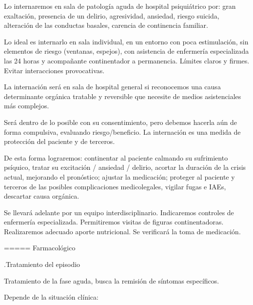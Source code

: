 \documentclass[encares.tex]{subfiles}
\begin{document}
Lo internaremos en sala de patología aguda de hospital psiquiátrico por: gran exaltación, presencia de un delirio, agresividad, ansiedad, riesgo suicida, alteración de las conductas basales, carencia de continencia familiar.

Lo ideal es internarlo en sala individual, en un entorno con poca estimulación, sin elementos de riesgo (ventanas, espejos), con asistencia de enfermería especializada las 24 horas y acompañante continentador a permanencia. Límites claros y firmes. Evitar interacciones provocativas.

La internación será en sala de hospital general si reconocemos una causa determinante orgánica tratable y reversible que necesite de medios asistenciales más complejos.

Será dentro de lo posible con su consentimiento, pero debemos hacerla aún de forma compulsiva, evaluando riesgo/beneficio. La internación es una medida de protección del paciente y de terceros.

De esta forma lograremos: continentar al paciente calmando su sufrimiento psíquico, tratar su excitación / ansiedad / delirio, acortar la duración de la crisis actual, mejorando el pronóstico; ajustar la medicación; proteger al paciente y terceros de las posibles complicaciones medicolegales, vigilar fugas e IAEs, descartar causa orgánica.

Se llevará adelante por un equipo interdisciplinario. Indicaremos controles de enfermería especializada. Permitiremos visitas de figuras continentadoras. Realizaremos adecuado aporte nutricional. Se verificará la toma de medicación.

===== Farmacológico

.Tratamiento del episodio

Tratamiento de la fase aguda, busca la remisión de síntomas específicos.

Depende de la situación clínica:
\end{document}
